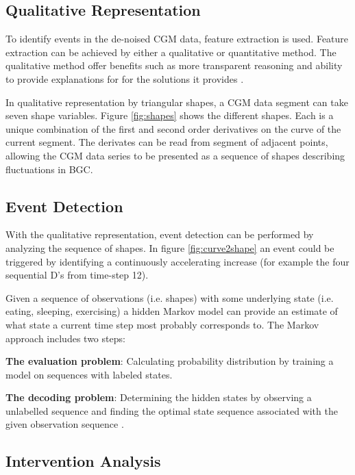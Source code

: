 

\subsection{Qualitative Representation}

To identify events in the de-noised CGM data, feature extraction is used.
Feature extraction can be achieved by either a qualitative or quantitative method.
The qualitative method offer benefits such as more transparent reasoning and ability to provide explanations for for the solutions it provides \parencite{Ven2003}.

In qualitative representation by triangular shapes, a CGM data segment can take seven shape variables.
Figure \ref{fig:shapes} shows the different shapes.
Each is a unique combination of the first and second order derivatives on the curve of the current segment.
The derivates can be read from segment of adjacent points, allowing the CGM data series to be presented as a sequence of shapes describing fluctuations in BGC.



\subsection{Event Detection}

With the qualitative representation, event detection can be performed by analyzing the sequence of shapes.
In figure \ref{fig:curve2shape} an event could be triggered by identifying a continuously accelerating increase (for example the four sequential D's from time-step 12).



Given a sequence of observations (i.e. shapes) with some underlying state (i.e. eating, sleeping, exercising) a hidden Markov model can provide an estimate of what state a current time step most probably corresponds to.
The Markov approach includes two steps:

\textbf{The evaluation problem}: Calculating probability distribution by training a model on sequences with labeled states.

\textbf{The decoding problem}: Determining the hidden states by observing a unlabelled sequence and finding the optimal state sequence associated with the given observation sequence \parencite{rabiner1989}.

\subsection{Intervention Analysis}

